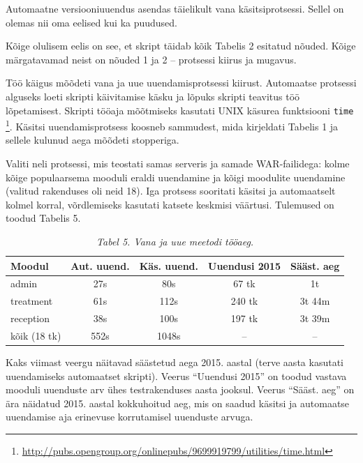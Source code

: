 \documentclass[12pt]{article}
\newcommand{\code}[1]{\texttt{#1}}
\begin{document}
  Automaatne versiooniuuendus asendas täielikult vana käsitsiprotsessi. Sellel on olemas nii oma eelised kui ka puudused.
  
  Kõige olulisem eelis on see, et skript täidab kõik Tabelis 2 esitatud nõuded. Kõige märgatavamad neist on nõuded 1 ja 2 \--- protsessi kiirus ja mugavus.
  
  Töö käigus mõõdeti vana ja uue uuendamisprotsessi kiirust. Automaatse protsessi alguseks loeti skripti käivitamise käsku ja lõpuks skripti teavitus töö lõpetamisest. Skripti tööaja mõõtmiseks kasutati UNIX käsurea funktsiooni \code{time} \footnote{\url{http://pubs.opengroup.org/onlinepubs/9699919799/utilities/time.html}}. Käsitsi uuendamisprotsess koosneb sammudest, mida kirjeldati Tabelis 1 ja sellele kulunud aega mõõdeti stopperiga.
  
  Valiti neli protsessi, mis teostati samas serveris ja samade WAR\--failidega: kolme kõige populaarsema mooduli eraldi uuendamine ja kõigi moodulite uuendamine (valitud rakenduses oli neid 18). Iga protsess sooritati käsitsi ja automaatselt kolmel korral, võrdlemiseks kasutati katsete keskmisi väärtusi. Tulemused on toodud Tabelis 5.
  
  \begin{table}[!htbp]
    \begin{center}
      \caption*{\textit{Tabel 5. Vana ja uue meetodi tööaeg.}}
      
      \begin{tabular}{| l | c | c | c | c |}
        \hline
         \textbf{Moodul} & \textbf{Aut. uuend.} & \textbf{Käs. uuend.} & \textbf{Uuendusi 2015} & \textbf{Sääst. aeg}\\
        \hline
        admin & 27s & 80s & 67 tk & 1t\\
        treatment & 61s & 112s & 240 tk & 3t 44m\\
        reception & 38s & 100s & 197 tk & 3t 39m \\
        kõik (18 tk) & 552s & 1048s & \--- & \---\\
        \hline
      \end{tabular}
    \end{center}
  \end{table}
  
  Kaks viimast veergu näitavad säästetud aega 2015. aastal (terve aasta kasutati uuendamiseks automaatset skripti). Veerus ``Uuendusi 2015'' on toodud vastava mooduli uuenduste arv ühes testrakenduses aasta jooksul. Veerus ``Sääst. aeg'' on ära näidatud 2015. aastal kokkuhoitud aeg, mis on saadud käsitsi ja automaatse uuendamise aja erinevuse korrutamisel uuenduste arvuga.
  
\end{document}
